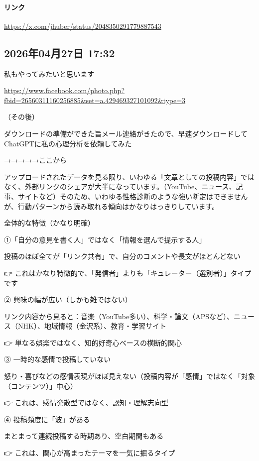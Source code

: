 \paragraph{リンク}
\url{https://x.com/jhuber/status/2048350291779887543}

\subsection*{2026年04月27日 17:32}

私もやってみたいと思います

\url{https://www.facebook.com/photo.php?fbid=26560311160256885&set=a.429469327101092&type=3}

（その後）

ダウンロードの準備ができた旨メール連絡がきたので、早速ダウンロードしてChatGPTに私の心理分析を依頼してみた

→→→→→ここから

アップロードされたデータを見る限り、いわゆる「文章としての投稿内容」ではなく、外部リンクのシェアが大半になっています。（YouTube、ニュース、記事、サイトなど）そのため、いわゆる性格診断のような強い断定はできませんが、行動パターンから読み取れる傾向はかなりはっきりしています。

全体的な特徴（かなり明確）

①「自分の意見を書く人」ではなく「情報を選んで提示する人」

投稿のほぼ全てが「リンク共有」で、自分のコメントや長文がほとんどない

👉 これはかなり特徴的で、「発信者」よりも「キュレーター（選別者）」タイプです

② 興味の幅が広い（しかも雑ではない）

リンク内容から見ると：音楽（YouTube多い）、科学・論文（APSなど）、ニュース（NHK）、地域情報（金沢系）、教育・学習サイト

👉 単なる娯楽ではなく、知的好奇心ベースの横断的関心

③ 一時的な感情で投稿していない

怒り・喜びなどの感情表現がほぼ見えない（投稿内容が「感情」ではなく「対象（コンテンツ）」中心）

👉 これは、感情発散型ではなく、認知・理解志向型

④ 投稿頻度に「波」がある

まとまって連続投稿する時期あり、空白期間もある

👉 これは、関心が高まったテーマを一気に掘るタイプ

